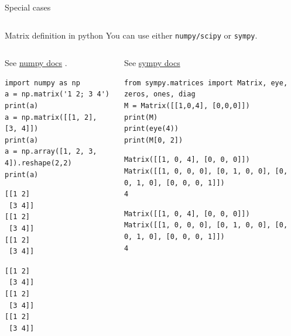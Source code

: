 \documentclass[xcolor=svgnames,t,10pt,allowframebreaks]{beamer}
\begin{document}
\begin{frame}[label={sec:org2d257f2}]{Special cases}
\begin{columns}
\begin{column}{0.45\columnwidth}
\begin{block}{}
\begin{itemize}
\end{itemize}
\end{block}
\end{column}
\end{columns}
\end{frame}

\begin{frame}[fragile,label={sec:orgb0269ec}]{Matrix definition in python}
 You can use either \texttt{numpy/scipy} or \texttt{sympy}.
\begin{columns}
\begin{column}{0.48\columnwidth}
\begin{block}{See \href{https://docs.scipy.org/doc/numpy-1.14.0/reference/generated/numpy.matrix.html}{numpy docs} .}
\begin{verbatim}
import numpy as np
a = np.matrix('1 2; 3 4')
print(a)
a = np.matrix([[1, 2], [3, 4]])
print(a)
a = np.array([1, 2, 3, 4]).reshape(2,2)
print(a)
\end{verbatim}

\begin{verbatim}
[[1 2]
 [3 4]]
[[1 2]
 [3 4]]
[[1 2]
 [3 4]]
\end{verbatim}

{\small
\begin{verbatim}
[[1 2]
 [3 4]]
[[1 2]
 [3 4]]
[[1 2]
 [3 4]]
\end{verbatim}
}
\end{block}
\end{column}
\begin{column}{0.48\columnwidth}
\begin{block}{See \href{http://docs.sympy.org/latest/modules/matrices/matrices.html}{sympy docs}}
\begin{verbatim}
from sympy.matrices import Matrix, eye, zeros, ones, diag
M = Matrix([[1,0,4], [0,0,0]])
print(M)
print(eye(4))
print(M[0, 2])
\end{verbatim}

\begin{verbatim}
Matrix([[1, 0, 4], [0, 0, 0]])
Matrix([[1, 0, 0, 0], [0, 1, 0, 0], [0, 0, 1, 0], [0, 0, 0, 1]])
4
\end{verbatim}

{\small
\begin{verbatim}
Matrix([[1, 0, 4], [0, 0, 0]])
Matrix([[1, 0, 0, 0], [0, 1, 0, 0], [0, 0, 1, 0], [0, 0, 0, 1]])
4
\end{verbatim}
}
\end{block}
\end{column}
\end{columns}
\end{frame}
\end{document}
